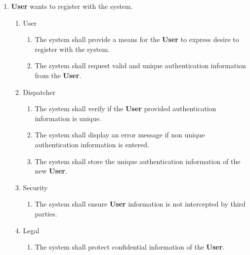 \documentclass[english]{article}
\begin{document}
\begin{enumerate}[{BE}1.]
	\item \textbf{User} wants to register with the system.
	\begin{enumerate}[{VP1}.1]
		\item User
			\begin{enumerate}
				\item The system shall provide a means for the \textbf{User} to express desire to register with the system.
				\item The system shall request valid and unique authentication information from the \textbf{User}. 			\end{enumerate}
		\item Dispatcher
			\begin{enumerate}
				\item The system shall verify if the \textbf{User} provided  authentication information is unique.
				\item The system shall display an error message if non unique authentication information is entered.
				\item The system shall store the unique authentication information of the new \textbf{User}. 
			\end{enumerate}
		\item Security
			\begin{enumerate}
			\item The system shall ensure \textbf{User} information is not intercepted by third parties.
			\end{enumerate}
		\item Legal
			\begin{enumerate}
			\item The system shall protect confidential information of the \textbf{User}.
			\end{enumerate}
	\end{enumerate}


\end{enumerate}
\end{document}
